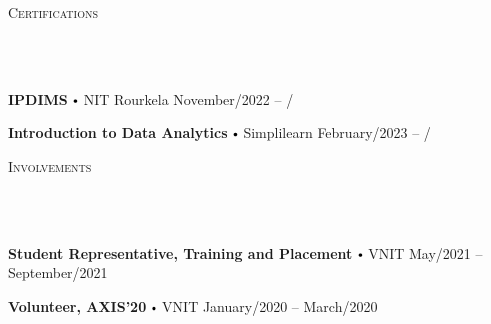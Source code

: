 \documentclass{article}
\newcommand{\lineunder}{
        \vspace*{-8pt} \\ \hspace*{-18pt} 
        \hrulefill \\
        }
\newcommand{\header}[1]{{
        \hspace*{-15pt}\vspace*{6pt} \textsc{#1}} \vspace*{-6pt} 
        \lineunder
        }
\renewcommand{\labelitemi}{
        $\vcenter{\hbox{\tiny$\bullet$}}$\hspace*{3pt}
        }
\renewcommand{\labelitemii}{
        $\vcenter{\hbox{\tiny$\bullet$}}$\hspace*{-3pt}
        }
\newenvironment{bullet-list-major}{
          \begin{list}{\labelitemii}{\setlength\leftmargin{3pt} 
          \topsep 0pt \itemsep -2pt}}{\vspace*{4pt}\end{list}
          }
\begin{document}
      \vspace*{4pt}%
      \header{Certifications}
      {
        \begin{bullet-list-major}
        \item \textbf{IPDIMS} \labelitemi NIT Rourkela \hfill November/2022 -- /
        \end{bullet-list-major}
        

        \begin{bullet-list-major}
        \item \textbf{Introduction to Data Analytics} \labelitemi Simplilearn \hfill February/2023 -- /
        \end{bullet-list-major}
        }
      \vspace*{4pt}%
      \header{Involvements}
      {
            \begin{bullet-list-major}
            \item \textbf{Student Representative, Training and Placement } \labelitemi VNIT \hfill May/2021 -- September/2021
            
            \end{bullet-list-major}
            

            \begin{bullet-list-major}
            \item \textbf{Volunteer, AXIS’20} \labelitemi VNIT \hfill January/2020 -- March/2020
            
            \end{bullet-list-major}
            }
      
\end{document}
